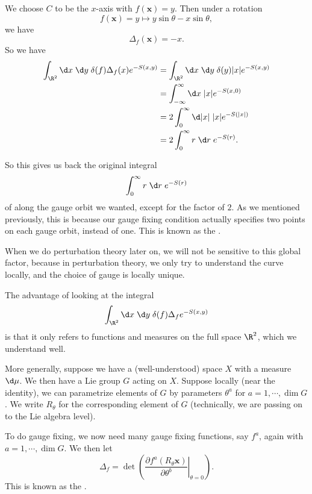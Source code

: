 \documentclass[a4paper]{article}
\begin{document}
\begin{eg}
  We choose $C$ to be the $x$-axis with $f(\mathbf{x}) = y$. Then under a rotation
  \[
    f(\mathbf{x}) = y \mapsto y \sin \theta - x \sin \theta,
  \]
  we have
  \[
    \Delta_f (\mathbf{x}) = -x.
  \]
  So we have
  \begin{align*}
    \int_{\R^2} \d x\; \d y\; \delta(f) \Delta_f (x) e^{-S(x, y)} &= \int_{\R^2} \d x\;\d y\; \delta(y) |x| e^{-S(x, y)}\\
    &= \int_{-\infty}^\infty \d x\; |x| e^{-S(x, 0)}\\
    &= 2 \int_0^\infty \d |x|\; |x| e^{-S(|x|)}\\
    &= 2 \int_0^\infty r\;\d r\;e^{-S(r)}.
  \end{align*}
\end{eg}
So this gives us back the original integral
\[
  \int_0^\infty r\;\d r\; e^{-S(r)}
\]
of along the gauge orbit we wanted, except for the factor of $2$. As we mentioned previously, this is because our gauge fixing condition actually specifies two points on each gauge orbit, instead of one. This is known as the .

When we do perturbation theory later on, we will not be sensitive to this global factor, because in perturbation theory, we only try to understand the curve locally, and the choice of gauge is locally unique.

The advantage of looking at the integral
\[
  \int_{\R^2}\d x\;\d y\; \delta(f) \Delta_f e^{-S(x, y)}
\]
is that it only refers to functions and measures on the full space $\R^2$, which we understand well.

More generally, suppose we have a (well-understood) space $X$ with a measure $\d \mu$. We then have a Lie group $G$ acting on $X$. Suppose locally (near the identity), we can parametrize elements of $G$ by parameters $\theta^a$ for $a = 1, \cdots, \dim G$. We write $R_\theta$ for the corresponding element of $G$ (technically, we are passing on to the Lie algebra level).

To do gauge fixing, we now need many gauge fixing functions, say $f^a$, again with $a = 1, \cdots, \dim G$. We then let
\[
  \Delta_f = \det\left(\left.\frac{\partial f^a(R_\theta \mathbf{x})}{\partial \theta^b}\right|_{\theta = 0}\right).
\]
This is known as the .
\end{document}
